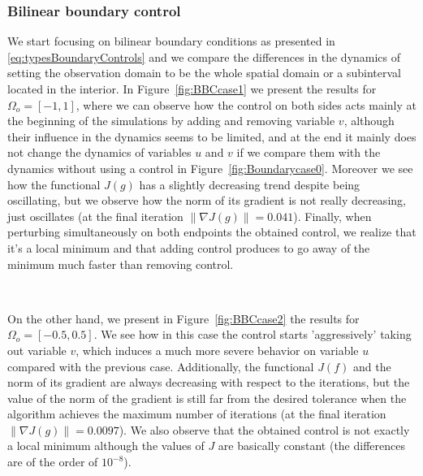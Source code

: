 \documentclass[11pt]{article}
\numberwithin{theorem}{section}
\begin{document}
\subsubsection{Bilinear boundary control}

We start focusing on bilinear boundary conditions as presented in \eqref{eq:typesBoundaryControls} and we compare the differences in the dynamics of setting the observation domain to be the whole spatial domain or a subinterval located in the interior. In Figure~\ref{fig:BBCcase1} we present the results for $\Omega_o=[-1,1]$, where we can observe how the control on both sides acts mainly at the beginning of the simulations by adding and removing variable $v$, although their influence in the dynamics seems to be limited, and at the end it mainly does not change the dynamics of variables $u$ and $v$ if we compare them with the dynamics without using a control  in Figure~\ref{fig:Boundarycase0}. Moreover we see how the functional $J(g)$ has a slightly decreasing trend despite being oscillating, but we observe how the norm of its gradient is not really decreasing, just oscillates (at the final iteration $\|\nabla J(g)\|=0.041$). Finally, when perturbing simultaneously on both endpoints the obtained control, we realize that it's a local minimum and that adding control produces to go away of the minimum much faster than removing control.

\

On the other hand, we present in Figure~\ref{fig:BBCcase2} the results for $\Omega_o=[-0.5,0.5]$. We see how in this case the control starts 'aggressively' taking out variable $v$, which induces a much more severe behavior on variable $u$ compared with the previous case. Additionally, the functional $J(f)$  and the norm of its gradient are always decreasing with respect to the iterations, but the value of  the norm of the gradient is still far from the desired tolerance when the algorithm achieves the maximum number of iterations (at the final iteration $\|\nabla J(g)\|=0.0097$). We also observe that the obtained control is not exactly a local minimum although the values of $J$ are basically constant (the differences are of the order of $10^{-8}$).
\end{document}
